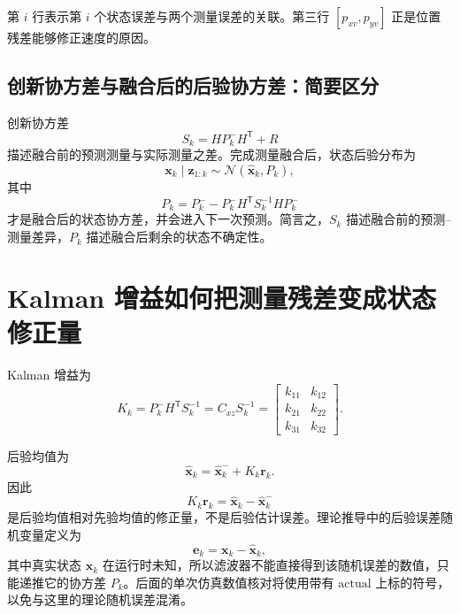 \documentclass[UTF8,a4paper,11pt]{ctexart}
\newcommand{\prior}{^{-}}
\newcommand{\transpose}{^{\mathsf T}}
\begin{document}
第 $i$ 行表示第 $i$ 个状态误差与两个测量误差的关联。第三行 $[p_{xv},p_{yv}]$ 正是位置残差能够修正速度的原因。

\subsection{创新协方差与融合后的后验协方差：简要区分}

创新协方差
\begin{equation}
S_k=HP_k\prior H\transpose+R
\end{equation}
描述融合前的预测测量与实际测量之差。完成测量融合后，状态后验分布为
\begin{equation}
\bm x_k\mid\bm z_{1:k}
\sim\mathcal N(\hat{\bm x}_k,P_k),
\end{equation}
其中
\begin{equation}
P_k
=P_k\prior-P_k\prior H\transpose S_k^{-1}HP_k\prior
\end{equation}
才是融合后的状态协方差，并会进入下一次预测。简言之，$S_k$ 描述融合前的预测--测量差异，$P_k$ 描述融合后剩余的状态不确定性。

\section{Kalman 增益如何把测量残差变成状态修正量}

Kalman 增益为
\begin{equation}
K_k=P_k\prior H\transpose S_k^{-1}
=C_{xz}S_k^{-1}
=
\begin{bmatrix}
k_{11}&k_{12}\\
k_{21}&k_{22}\\
k_{31}&k_{32}
\end{bmatrix}.
\end{equation}

后验均值为
\begin{equation}
\hat{\bm x}_k
=\hat{\bm x}_k\prior+K_k\bm r_k.
\end{equation}
因此
\begin{equation}
\boxed{K_k\bm r_k=\hat{\bm x}_k-\hat{\bm x}_k\prior}
\end{equation}
是后验均值相对先验均值的修正量，不是后验估计误差。理论推导中的后验误差随机变量定义为
\begin{equation}
\bm e_k=\bm x_k-\hat{\bm x}_k,
\end{equation}
其中真实状态 $\bm x_k$ 在运行时未知，所以滤波器不能直接得到该随机误差的数值，只能递推它的协方差 $P_k$。后面的单次仿真数值核对将使用带有 $\mathrm{actual}$ 上标的符号，以免与这里的理论随机误差混淆。
\end{document}

